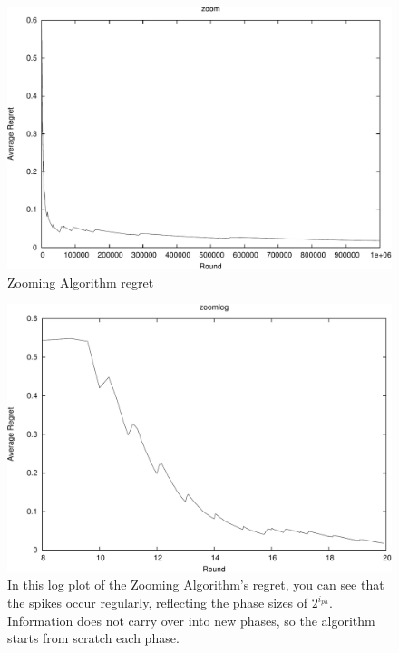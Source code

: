 \documentclass{article}
\begin{document}
\begin{figure}[htb]
  \begin{center}
     \includegraphics[width=\figwidth]{images/zoom-crop.pdf}
     \caption{Zooming Algorithm regret}
     \label{fig:zoom}
  \end{center}
\end{figure}

\begin{figure}[htb]
  \begin{center}
     \includegraphics[width=\figwidth]{images/zoomlog-crop.pdf}
     \caption{In this log plot of the Zooming Algorithm's regret, you can see that the spikes occur regularly, reflecting the phase sizes of $2^{i_{ph}}$. Information does not carry over into new phases, so the algorithm starts from scratch each phase.}
     \label{fig:zoomlog}
  \end{center}
\end{figure}
\end{document}
